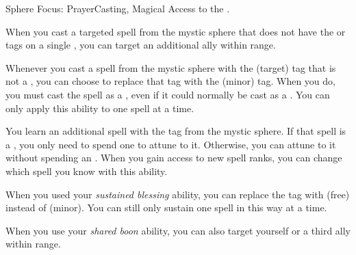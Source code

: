     \begin{feat}{Sphere Focus: Prayer}{Casting, Magical}
        \featpre Access to the  .

         When you cast a targeted spell from the  mystic sphere that does not have the  or  tags on a single , you can target an additional ally within range.

         Whenever you cast a spell from the  mystic sphere with the  (target) tag that is not a , you can choose to replace that tag with the  (minor) tag.
        When you do, you must cast the spell as a , even if it could normally be cast as a .
        You can only apply this ability to one spell at a time.

         You learn an additional spell with the  tag from the  mystic sphere.
        If that spell is a , you only need to spend one  to attune to it.
        Otherwise, you can attune to it without spending an .
        When you gain access to new spell ranks, you can change which spell you know with this ability.

         When you used your \textit{sustained blessing} ability, you can replace the tag with  (free) instead of  (minor).
        You can still only sustain one spell in this way at a time.

         When you use your \textit{shared boon} ability, you can also target yourself or a third ally within range.
    \end{feat}

